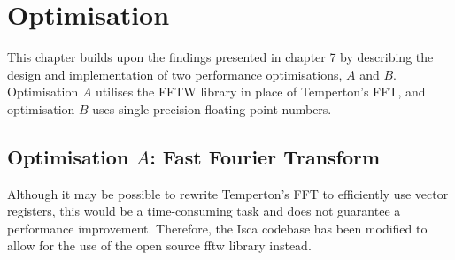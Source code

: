 \documentclass[a4paper,11pt]{report}
\begin{document}
\let\textcircled=\pgftextcircled
\chapter[Optimisation]{Optimisation}
\label{chap:optimiations}
This chapter builds upon the findings presented in chapter 7 by describing the design and implementation of two performance optimisations, $A$ and $B$. Optimisation $A$ utilises the FFTW library in place of Temperton's FFT, and optimisation $B$ uses single-precision floating point numbers. 

\section[FFT optimisation]{Optimisation $A$: Fast Fourier Transform}
Although it may be possible to rewrite Temperton's FFT to efficiently use vector registers, this would be a time-consuming task and does not guarantee a performance improvement. Therefore, the Isca codebase has been modified to allow for the use of the open source \gls{fftw} library instead.
\end{document}
